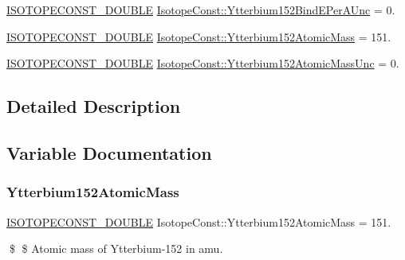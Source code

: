 \begin{DoxyCompactItemize}
\mbox{\hyperlink{group___isotope_const-_macros_ga8f45a7272ce02c0b4c65c44636ed719a}{I\+S\+O\+T\+O\+P\+E\+C\+O\+N\+S\+T\+\_\+\+D\+O\+U\+B\+LE}} \mbox{\hyperlink{group___isotope_const-_ytterbium-_yb152_ga813ba5dd2d15679b069d8beac26f222d}{Isotope\+Const\+::\+Ytterbium152\+Bind\+E\+Per\+A\+Unc}} = 0.
\item 
\mbox{\hyperlink{group___isotope_const-_macros_ga8f45a7272ce02c0b4c65c44636ed719a}{I\+S\+O\+T\+O\+P\+E\+C\+O\+N\+S\+T\+\_\+\+D\+O\+U\+B\+LE}} \mbox{\hyperlink{group___isotope_const-_ytterbium-_yb152_ga59b371f209cbdc253c2a1d88867472c3}{Isotope\+Const\+::\+Ytterbium152\+Atomic\+Mass}} = 151.
\item 
\mbox{\hyperlink{group___isotope_const-_macros_ga8f45a7272ce02c0b4c65c44636ed719a}{I\+S\+O\+T\+O\+P\+E\+C\+O\+N\+S\+T\+\_\+\+D\+O\+U\+B\+LE}} \mbox{\hyperlink{group___isotope_const-_ytterbium-_yb152_ga5c7c36e59f600696e6b406423d5fd83c}{Isotope\+Const\+::\+Ytterbium152\+Atomic\+Mass\+Unc}} = 0.
\end{DoxyCompactItemize}


\subsection{Detailed Description}


\subsection{Variable Documentation}
\mbox{\label{group___isotope_const-_ytterbium-_yb152_ga59b371f209cbdc253c2a1d88867472c3}} 
\subsubsection{\texorpdfstring{Ytterbium152\+Atomic\+Mass}{Ytterbium152AtomicMass}}
{\footnotesize\ttfamily \mbox{\hyperlink{group___isotope_const-_macros_ga8f45a7272ce02c0b4c65c44636ed719a}{I\+S\+O\+T\+O\+P\+E\+C\+O\+N\+S\+T\+\_\+\+D\+O\+U\+B\+LE}} Isotope\+Const\+::\+Ytterbium152\+Atomic\+Mass = 151.}

\$ \$ Atomic mass of Ytterbium-\/152 in amu. \mbox{\label{group___isotope_const-_ytterbium-_yb152_ga5c7c36e59f600696e6b406423d5fd83c}} 

